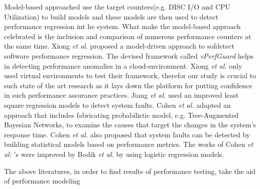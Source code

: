 Model-based approached use the target counters(e.g. DISC I/O and CPU Utilization) to build models and these models are then used to detect performance regression int he system. What make the model-based approach celebrated is the inclusion and comparison of numerous performance counters at the same time. 
Xiong \textit{et al.} \cite{xiong2013vperfguard} proposed a model-driven approach to sofdetect software performance regression. The devised framework called \textit{vPerfGuard} helps in detecting performance anomalies in a cloud-environment. Xiong \textit{et al.} \cite{xiong2013vperfguard} only used virtual environments to test their framework, therefor our study is crucial to such state of the art research as it lays down the platform for putting confidence in such performance assurance practices.
Jiang \textit{et al. }\cite{jiang2011system} used an improved least square regression models to detect system faults.
Cohen \textit{et al. }\cite{cohen2004correlating} adapted an approach that includes fabricating probabilistic model, e.g. Tree-Augmented Bayesian Networks, to examine the causes that target the changes in the system's response time. Cohen \textit{et al. }\cite{Cohen:2005:CIC:1095810.1095821} also proposed that system faults can be detected by building statistical models based on performance metrics. The works of Cohen \textit{et al: }'s \cite{cohen2004correlating} \cite{Cohen:2005:CIC:1095810.1095821} were improved by Bodik \textit{et al.} \cite{bodik2008hilighter} by using logistic regression models.

The above literatures, in order to find results of performance testing, take the aid of performance modeling 

